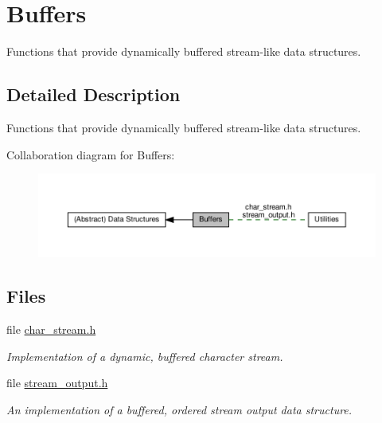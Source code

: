 \hypertarget{group__buffer__utils}{}\section{Buffers}
\label{group__buffer__utils}


Functions that provide dynamically buffered stream-\/like data structures.  




\subsection{Detailed Description}
Functions that provide dynamically buffered stream-\/like data structures. 

Collaboration diagram for Buffers\+:
\nopagebreak
\begin{figure}[H]
\begin{center}
\leavevmode
\includegraphics[width=350pt]{group__buffer__utils}
\end{center}
\end{figure}
\subsection*{Files}
\begin{DoxyCompactItemize}
\item 
file \hyperlink{datastructures_2char__stream_8h}{char\+\_\+stream.\+h}
\begin{DoxyCompactList}\small\item\em Implementation of a dynamic, buffered character stream. \end{DoxyCompactList}\item 
file \hyperlink{datastructures_2stream__output_8h}{stream\+\_\+output.\+h}
\begin{DoxyCompactList}\small\item\em An implementation of a buffered, ordered stream output data structure. \end{DoxyCompactList}\end{DoxyCompactItemize}

